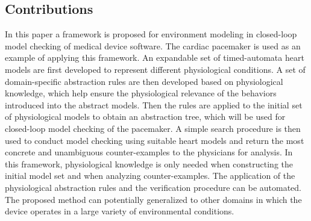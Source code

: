 \subsection{Contributions}
In this paper a framework is proposed for environment modeling in closed-loop model checking of medical device software.
The cardiac pacemaker is used as an example of applying this framework.
An expandable set of timed-automata heart models are first developed to represent different physiological conditions. 
A set of domain-specific abstraction rules are then developed based on physiological knowledge, which help ensure the physiological relevance of the behaviors introduced into the abstract models. 
Then the rules are applied to the initial set of physiological models to obtain an abstraction tree, which will be used for closed-loop model checking of the pacemaker. 
A simple search procedure is then used to conduct model checking using suitable heart models and return the most concrete and unambiguous counter-examples to the physicians for analysis. 
In this framework, physiological knowledge is only needed when constructing the initial model set and when analyzing counter-examples. 
The application of the physiological abstraction rules and the verification procedure can be automated.
The proposed method can potentially generalized to other domains in which the device operates in a large variety of environmental conditions.

